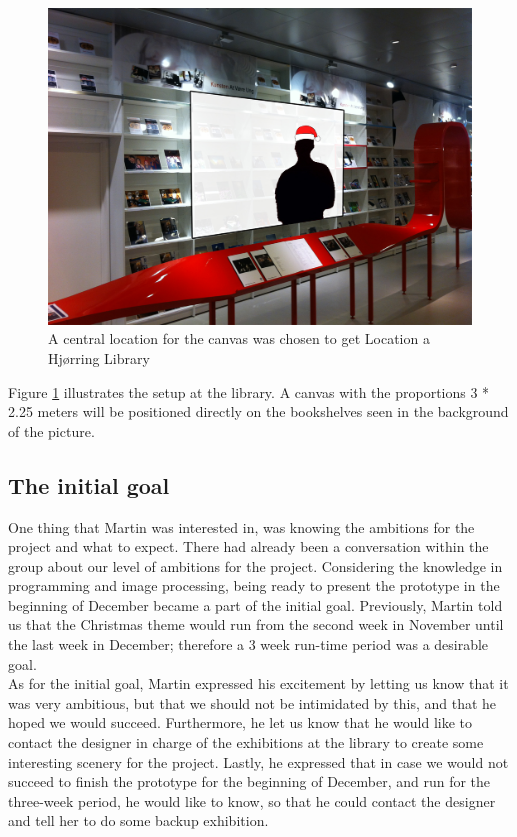 \begin{figure}[htbp]
\centering
\includegraphics[width=1.00\textwidth]{Pictures/HjoerringLibrary/LocationJohannesHat.jpg}
\caption{A central location for the canvas was chosen to get Location a Hj{\o}rring Library}
\label{fig:concept_art}
\end{figure}
Figure \ref{fig:concept_art} illustrates the setup at the library. A canvas with the proportions 3 * 2.25 meters will be positioned directly on the bookshelves seen in the background of the picture.

\subsection{The initial goal}
One thing that Martin was interested in, was knowing the ambitions for the project and what to expect. There had already been a conversation within the group about our level of ambitions for the project. Considering the knowledge in programming and image processing, being ready to present the prototype in the beginning of December became a part of the initial goal. Previously, Martin told us that the Christmas theme would run from the second week in November until the last week in December; therefore a 3 week run-time period was a desirable goal.\\
As for the initial goal, Martin expressed his excitement by letting us know that it was very ambitious, but that we should not be intimidated by this, and that he hoped we would succeed. Furthermore, he let us know that he would like to contact the designer in charge of the exhibitions at the library to create some interesting scenery for the project. Lastly, he expressed that in case we would not succeed to finish the prototype for the beginning of December, and run for the three-week period, he would like to know, so that he could contact the designer and tell her to do some backup exhibition.

